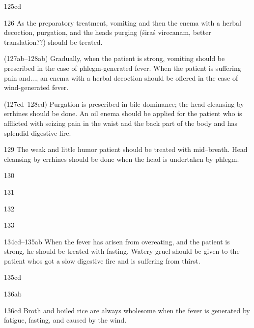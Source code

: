 \begin{translation}
   \item[125cd]  
    
    \item[126]  As the preparatory treatment, vomiting and then the enema with 
a
    herbal decoction, purgation, and the head\textquotesingle s purging
    (śiraś virecanam, better translation??) should be treated.
    
    
    (127ab--128ab) Gradually, when the patient is strong, vomiting should be
    prescribed in the case of phlegm-generated fever. When the patient is
    suffering pain and..., an enema with a
    herbal decoction should be offered in the case of wind-generated fever.
    
    (127cd--128cd) Purgation is prescribed in bile dominance; the head
    cleansing by errhines should be done. An oil enema should be applied for
    the patient who is afflicted with seizing pain in the waist and the back
    part of the body and has splendid digestive fire.
    
    \item[129]  The weak and little humor patient should be treated with
    mid--breath. Head cleansing by errhines should be done when the head is
    undertaken by phlegm.
    
    
   \item[130]  
    
   \item[131]  
    
   \item[132]  
    
   \item[133]  
    
    \item[134cd--135ab]  When the fever has arisen from overeating, and the 
patient
    is strong, he should be treated with fasting. Watery gruel should be
    given to the patient who\textquotesingle s got a slow digestive fire and
    is suffering from thirst.
    
   \item[135cd]  
    
   \item[136ab]  
    
    \item[136cd]  Broth and boiled rice are always wholesome when the fever is
    generated by fatigue, fasting, and caused by the wind.
    

\end{translation}
